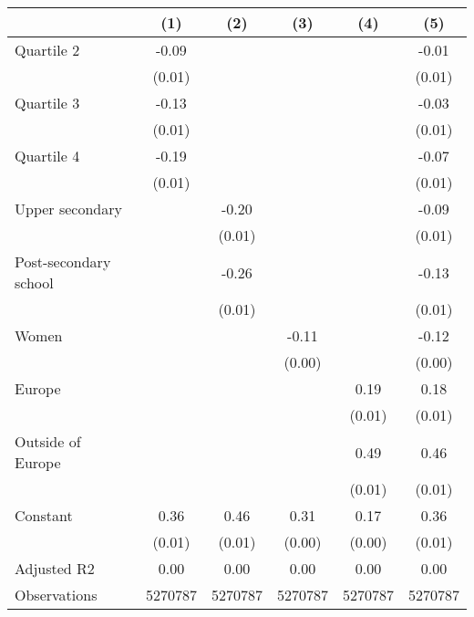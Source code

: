 
\begin{tabular}{@{}l*{5}{S[table-format={-}2.2{\tnote{***}}]}@{}}
\toprule
{} & {(1)} & {(2)} & {(3)} & {(4)} & {(5)}\tabularnewline%
\midrule
Quartile 2 & -0.09\tnote{***} &  &  &  & -0.01\tabularnewline%
 & (0.01) &  &  &  & \vphantom{2} (0.01)\tabularnewline%
Quartile 3 & -0.13\tnote{***} &  &  &  & -0.03\tnote{***}\tabularnewline%
 & (0.01) &  &  &  & \vphantom{1} (0.01)\tabularnewline%
Quartile 4 & -0.19\tnote{***} &  &  &  & -0.07\tnote{***}\tabularnewline%
 & (0.01) &  &  &  & (0.01)\tabularnewline%
Upper secondary &  & -0.20\tnote{***} &  &  & -0.09\tnote{***}\tabularnewline%
 &  & (0.01) &  &  & \vphantom{1} (0.01)\tabularnewline%
Post-secondary school &  & -0.26\tnote{***} &  &  & -0.13\tnote{***}\tabularnewline%
 &  & (0.01) &  &  & (0.01)\tabularnewline%
Women &  &  & -0.11\tnote{***} &  & -0.12\tnote{***}\tabularnewline%
 &  &  & (0.00) &  & (0.00)\tabularnewline%
Europe &  &  &  & 0.19\tnote{***} & 0.18\tnote{***}\tabularnewline%
 &  &  &  & (0.01) & \vphantom{1} (0.01)\tabularnewline%
Outside of Europe &  &  &  & 0.49\tnote{***} & 0.46\tnote{***}\tabularnewline%
 &  &  &  & (0.01) & (0.01)\tabularnewline%
Constant & 0.36\tnote{***} & 0.46\tnote{***} & 0.31\tnote{***} & 0.17\tnote{***} & 0.36\tnote{***}\tabularnewline%
 & (0.01) & (0.01) & (0.00) & (0.00) & (0.01)\tabularnewline%
\midrule
Adjusted R2 & 0.00 & 0.00 & 0.00 & 0.00 & 0.00\tabularnewline%
Observations & {\num{5270787}} & {\num{5270787}} & {\num{5270787}} & {\num{5270787}} & {\num{5270787}}\tabularnewline%
\bottomrule
\end{tabular}
